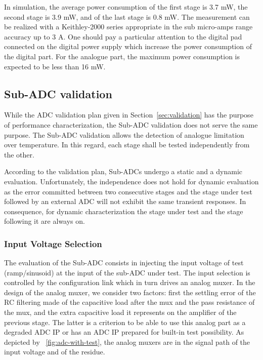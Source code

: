 In simulation, the average power consumption of the first stage is 3.7 mW, the second stage is 3.9 mW, and of the last stage is 0.8 mW. The measurement can be realized with a Keithley-2000 series appropriate in the sub micro-amps range accuracy up to 3 A. One should pay a particular attention to the digital pad connected on the digital power supply which increase the power consumption of the digital part. For the analogue part, the maximum power consumption is expected to be less than 16 mW.

\subsection{Sub-ADC validation}
While the ADC validation plan given in Section~\ref{sec:validation} has the purpose of performance characterization, the Sub-ADC validation does not serve the same purpose. The Sub-ADC validation allows the detection of analogue limitation over temperature. In this regard, each stage shall be tested independently from the other.

According to the validation plan, Sub-ADCs undergo a static and a dynamic evaluation. Unfortunately, the independence does not hold for dynamic evaluation as the error committed between two consecutive stages and the stage under test followed by an external ADC will not exhibit the same transient responses. In consequence, for dynamic characterization the stage under test and the stage following it are always on.

    \subsubsection{Input Voltage Selection}
The evaluation of the Sub-ADC consists in injecting the input voltage of test (ramp/sinusoid) at the input of the sub-ADC under test. The input selection is controlled by the configuration link which in turn drives an analog muxer. In the design of the analog muxer, we consider two factors: first the settling error of the RC filtering made of the capacitive load after the mux and the pass resistance of the mux, and the extra capacitive load it represents on the amplifier of the previous stage. The latter is a criterion to be able to use this analog part as a degraded ADC IP or has an ADC IP prepared for built-in test possibility. As depicted by \figurename~\ref{fig:adc-with-test}, the analog muxers are in the signal path of the input voltage and of the residue.

